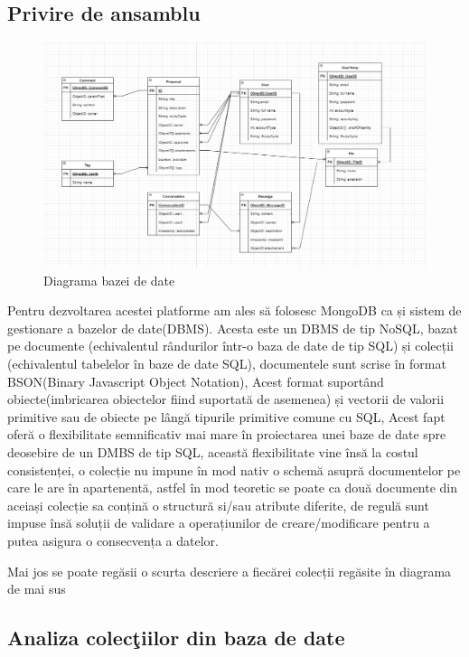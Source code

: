 \documentclass[12pt,a4paper,hidelinks]{report}
\theoremstyle{definition}
\theoremstyle{remark}
\begin{document}
\subsection{Privire de ansamblu}
\begin{figure}[H]
    \centering
    \includegraphics[scale=0.4]{images/DB_Diagram.png}
    \caption{Diagrama bazei de date}
    \label{fig:dbDiagram}
\end{figure}
Pentru dezvoltarea acestei platforme am ales să folosesc MongoDB ca și sistem de gestionare a bazelor de date(DBMS). Acesta este un DBMS de tip NoSQL, bazat pe documente (echivalentul rândurilor într-o baza de date de tip SQL) și colecții (echivalentul tabelelor în baze de date SQL), documentele sunt scrise în format BSON(Binary Javascript Object Notation), Acest format suportând obiecte(imbricarea obiectelor fiind suportată de asemenea) și vectorii de valorii primitive sau de obiecte pe lângă tipurile primitive comune cu SQL, Acest fapt oferă o flexibilitate semnificativ mai mare în proiectarea unei baze de date spre deosebire de un DMBS de tip  SQL, această flexibilitate vine însă la costul consistenței, o colecție nu impune în mod nativ o schemă asupră documentelor pe care le are în apartenentă, astfel în mod teoretic se poate ca două documente din aceiași colecție sa conțină o structură si/sau atribute diferite, de regulă sunt impuse însă soluții de validare a operațiunilor de creare/modificare pentru a putea asigura o consecvența a datelor.

Mai jos se poate regăsii o scurta descriere a fiecărei colecții regăsite în diagrama de mai sus
\subsection{Analiza colec\c tiilor din baza de date}
\end{document}
